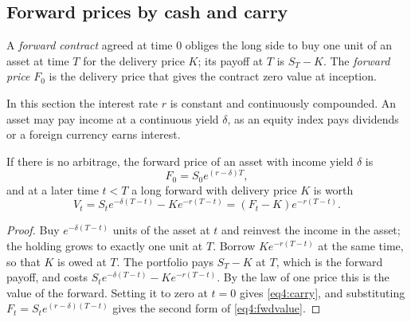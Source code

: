\begin{chapterrefs}
\section{Forward prices by cash and carry}
\label{sec4:fwd}

\begin{definition}\label{def4:forward}
A \emph{forward contract} agreed at time $0$ obliges the long side to buy one unit of an asset at time
$T$ for the delivery price $K$; its payoff at $T$ is $S_T-K$. The \emph{forward price} $F_0$ is the
delivery price that gives the contract zero value at inception.
\end{definition}

In this section the interest rate $r$ is constant and continuously compounded. An asset may pay income
at a continuous yield $\delta$, as an equity index pays dividends or a foreign currency earns interest.

\begin{proposition}\label{prop4:carry}
If there is no arbitrage, the forward price of an asset with income yield $\delta$ is
\begin{equation}\label{eq4:carry}
  F_0=S_0e^{(r-\delta)T},
\end{equation}
and at a later time $t<T$ a long forward with delivery price $K$ is worth
\begin{equation}\label{eq4:fwdvalue}
  V_t=S_te^{-\delta(T-t)}-Ke^{-r(T-t)}=(F_t-K)e^{-r(T-t)} .
\end{equation}
\end{proposition}

\begin{proof}
Buy $e^{-\delta(T-t)}$ units of the asset at $t$ and reinvest the income in the asset; the holding grows to
exactly one unit at $T$. Borrow $Ke^{-r(T-t)}$ at the same time, so that $K$ is owed at $T$. The
portfolio pays $S_T-K$ at $T$, which is the forward payoff, and costs
$S_te^{-\delta(T-t)}-Ke^{-r(T-t)}$. By the law of one price this is the value of the forward. Setting it
to zero at $t=0$ gives \cref{eq4:carry}, and substituting $F_t=S_te^{(r-\delta)(T-t)}$ gives the second form
of \cref{eq4:fwdvalue}.
\end{proof}


\end{chapterrefs}
